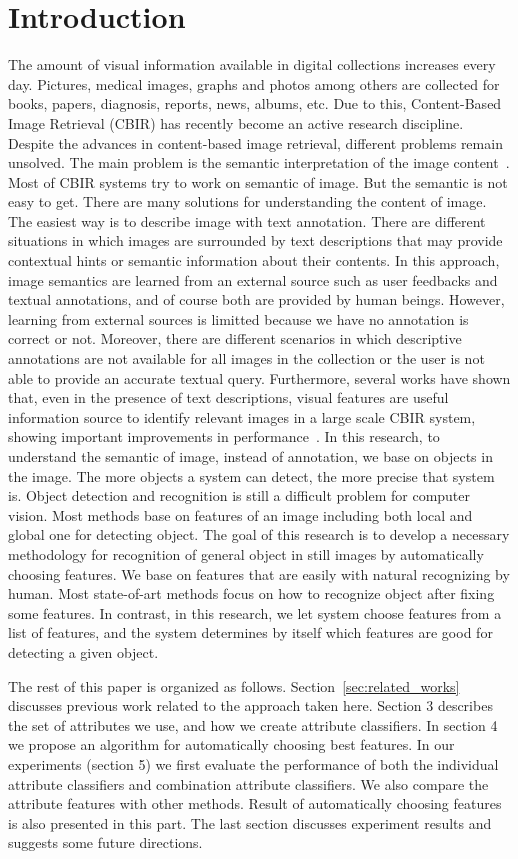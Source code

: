 \section{Introduction}
\label{sec:introduction}
The amount of visual information available in digital collections
increases every day. Pictures, medical images, graphs and photos
among others are collected for books, papers, diagnosis, reports,
news, albums, etc. Due to this, Content-Based Image Retrieval
(CBIR) has recently become an active research discipline. Despite
the advances in content-based image retrieval, different problems
remain unsolved. The main problem is the semantic interpretation of
the image content~\cite{smeulders2000content}. Most of CBIR systems try to work on
semantic of image. But the semantic is not easy to get. There are
many solutions for understanding the content of image. The easiest
way is to describe image with text annotation. There are different
situations in which images are surrounded by text descriptions that
may provide contextual hints or semantic information about their
contents. In this approach, image semantics are learned from an
external source such as user feedbacks and textual annotations, and
of course both are provided by human beings. 
However, learning from external sources is limitted because we have no
annotation is correct or not. Moreover, there are different scenarios
in which descriptive annotations are not available for all images in
the collection or the user is not able to provide an accurate textual
query. Furthermore, several works have shown that, even in the
presence of text descriptions, visual features are useful
information source to identify relevant images in a large scale CBIR
system, showing important improvements in performance~\cite{jing2007canoical,grubinger2008advances}.
In this research, to understand the semantic of image, instead of
annotation, we base on objects in the image. The more objects a
system can detect, the more precise that system is. Object detection
and recognition is still a difficult problem for computer vision. Most
methods base on features of an image including both local and
global one for detecting object. The goal of this research is to
develop a necessary methodology for recognition of general object
in still images by automatically choosing features. We base on
features that are easily with natural recognizing by human. Most
state-of-art methods focus on how to recognize object after fixing
some features. In contrast, in this research, we let system choose
features from a list of features, and the system determines by itself
which features are good for detecting a given object.

The rest of this paper is organized as follows. Section~\ref{sec:related_works} discusses
previous work related to the approach taken here. Section 3
describes the set of attributes we use, and how we create attribute
classifiers. In section 4 we propose an algorithm for automatically
choosing best features. In our experiments (section 5) we first
evaluate the performance of both the individual attribute classifiers
and combination attribute classifiers. We also compare the attribute features 
with other methods. Result of automatically choosing features is also presented in this part.
The last section discusses experiment results and suggests some future directions.
